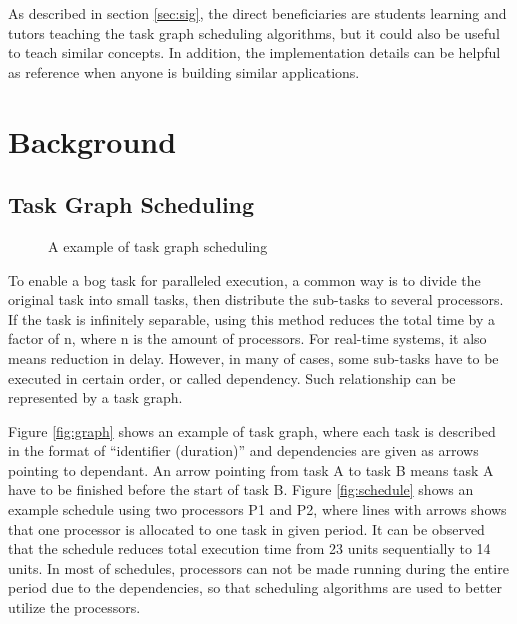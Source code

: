 \documentclass[a4paper,11pt]{article}
\begin{document}
As described in section \ref{sec:sig}, the direct beneficiaries are students learning and tutors teaching the task graph scheduling algorithms, but it could also be useful to teach similar concepts. In addition, the implementation details can be helpful as reference when anyone is building similar applications. 

\section{Background}

\subsection{Task Graph Scheduling} \label{sec:tgs}

\begin{figure}[htpb]
    \centering
     \hspace{2em}
    \caption{A example of task graph scheduling}
    \label{fig:example}
\end{figure}

To enable a bog task for paralleled execution, a common way is to divide the original task into small tasks, then distribute the sub-tasks to several processors. If the task is infinitely separable, using this method reduces the total time by a factor of n, where n is the amount of processors. For real-time systems, it also means reduction in delay. However, in many of cases, some sub-tasks have to be executed in certain order, or called dependency. Such relationship can be represented by a task graph.

Figure \ref{fig:graph} shows an example of task graph, where each task is described in the format of ``identifier (duration)'' and dependencies are given as arrows pointing to dependant. An arrow pointing from task A to task B means task A have to be finished before the start of task B. Figure \ref{fig:schedule} shows an example schedule using two processors P1 and P2, where lines with arrows shows that one processor is allocated to one task in given period. It can be observed that the schedule reduces total execution time from 23 units sequentially to 14 units. In most of schedules, processors can not be made running during the entire period due to the dependencies, so that scheduling algorithms are used to better utilize the processors.
\end{document}
